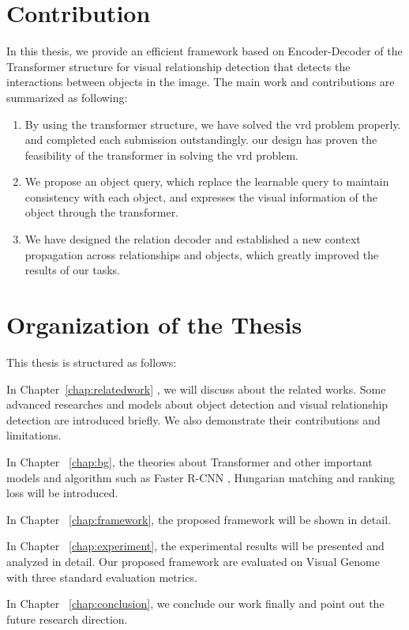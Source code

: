 \section{Contribution}

In this thesis, we provide  an efficient framework based on Encoder-Decoder of the  Transformer structure  for visual relationship detection that detects the interactions between objects in the image. The main work and contributions are summarized as following:
\begin{enumerate}[\qquad  1.]
	\item By using the transformer structure, we have solved the vrd problem properly. and completed  each submission outstandingly. our design has proven the feasibility of the transformer in solving the vrd problem.
	\item We propose an object query, which replace the learnable query to maintain consistency with each object, and expresses the visual information of the object through the transformer.
	\item We have designed the relation decoder and established a new context propagation across relationships and objects, which greatly improved the results of our tasks.
\end{enumerate}


\section{Organization of the Thesis}
This thesis is structured as follows:

In Chapter~\ref{chap:relatedwork} , we will discuss about the related works. Some advanced researches and models about object detection and visual relationship detection are introduced briefly. We also demonstrate their contributions and limitations.

In Chapter ~\ref{chap:bg}, the theories about Transformer and other important models and algorithm such as Faster R-CNN , Hungarian matching and ranking loss  will be introduced.

In Chapter ~\ref{chap:framework}, the proposed framework will be shown in detail.

In Chapter ~\ref{chap:experiment}, the experimental results will be presented and analyzed in detail. Our proposed framework are evaluated on Visual Genome with three standard evaluation metrics.

In Chapter ~\ref{chap:conclusion}, we conclude our work finally and point out the future research direction.